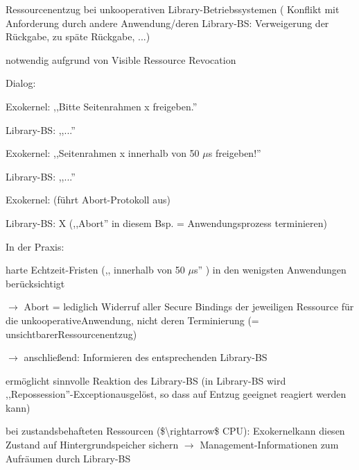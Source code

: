 \documentclass[a4paper]{article}
\begin{document}
\begin{multicols}{3}
    \begin{itemize*}
        \item
        Ressourcenentzug bei unkooperativen Library-Betriebssystemen (
        Konflikt mit Anforderung durch andere Anwendung/deren Library-BS:
        Verweigerung der Rückgabe, zu späte Rückgabe, ...)
        \item
        notwendig aufgrund von Visible Ressource Revocation
        \item
        Dialog:
        \begin{itemize*}
            \item Exokernel: ,,Bitte Seitenrahmen x freigeben.''
            \item Library-BS: ,,...''
            \item Exokernel: ,,Seitenrahmen x innerhalb von 50 $\mu$s freigeben!''
            \item Library-BS: ,,...''
            \item Exokernel: (führt Abort-Protokoll aus)
            \item Library-BS: X (,,Abort'' in diesem Bsp. = Anwendungsprozess terminieren)
        \end{itemize*}
        \item
        In der Praxis:
        \begin{itemize*}
            \item harte Echtzeit-Fristen (,, innerhalb von 50 $\mu$s'' ) in den wenigsten Anwendungen berücksichtigt \begin{itemize*} \item   $\rightarrow$  Abort = lediglich Widerruf aller   Secure Bindings der jeweiligen Ressource für die   unkooperativeAnwendung, nicht deren Terminierung (=   unsichtbarerRessourcenentzug) \item   $\rightarrow$  anschließend: Informieren des   entsprechenden Library-BS \end{itemize*}
            \item ermöglicht sinnvolle Reaktion des Library-BS (in Library-BS wird ,,Repossession''-Exceptionausgelöst, so dass auf Entzug geeignet reagiert werden kann)
            \item bei zustandsbehafteten Ressourcen (\$\textbackslash rightarrow\$ CPU): Exokernelkann diesen Zustand auf Hintergrundspeicher sichern $\rightarrow$  Management-Informationen zum Aufräumen durch Library-BS
        \end{itemize*}
    \end{itemize*}



\end{multicols}
\end{document}

